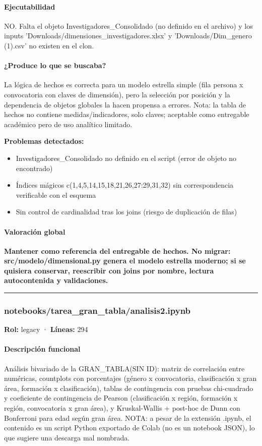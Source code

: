 \paragraph{Ejecutabilidad}
NO. Falta el objeto Investigadores\_Consolidado (no definido en el archivo) y los inputs 'Downloads/dimensiones\_investigadores.xlsx' y 'Downloads/Dim\_genero (1).csv' no existen en el clon.

\paragraph{¿Produce lo que se buscaba?}
La lógica de hechos es correcta para un modelo estrella simple (fila persona x convocatoria con claves de dimensión), pero la selección por posición y la dependencia de objetos globales la hacen propensa a errores. Nota: la tabla de hechos no contiene medidas/indicadores, solo claves; aceptable como entregable académico pero de uso analítico limitado.

\begin{tcolorbox}[riesgo]
\textbf{Problemas detectados:}
\begin{itemize}
  \item Investigadores\_Consolidado no definido en el script (error de objeto no encontrado)
  \item Índices mágicos c(1,4,5,14,15,18,21,26,27:29,31,32) sin correspondencia verificable con el esquema
  \item Sin control de cardinalidad tras los joins (riesgo de duplicación de filas)
\end{itemize}
\end{tcolorbox}

\paragraph{Valoración global}
\textbf{Mantener como referencia del entregable de hechos. No migrar: src/modelo/dimensional.py genera el modelo estrella moderno; si se quisiera conservar, reescribir con joins por nombre, lectura autocontenida y validaciones.}

\medskip
\hrule

\subsubsection{notebooks/tarea\_gran\_tabla/analisis2.ipynb}
\textbf{Rol:} legacy · \textbf{Líneas:} 294

\paragraph{Descripción funcional}
Análisis bivariado de la GRAN\_TABLA(SIN ID): matriz de correlación entre numéricas, countplots con porcentajes (género x convocatoria, clasificación x gran área, formación x clasificación), tablas de contingencia con pruebas chi-cuadrado y coeficiente de contingencia de Pearson (clasificación x región, formación x región, convocatoria x gran área), y Kruskal-Wallis + post-hoc de Dunn con Bonferroni para edad según gran área. NOTA: a pesar de la extensión .ipynb, el contenido es un script Python exportado de Colab (no es un notebook JSON), lo que sugiere una descarga mal nombrada.

